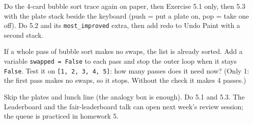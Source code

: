 \begin{differentiation}
\supportpath Do the 4-card bubble sort trace again on paper, then Exercise 5.1 only, then 5.3 with the plate stack beside the keyboard (push = put a plate on, pop = take one off).
\extensionpath Do 5.2 and its \texttt{most\_improved} extra, then add redo to Undo Paint with a second stack.
\end{differentiation}

\begin{stretchchallenge}
If a whole pass of bubble sort makes no swaps, the list is already sorted. Add a variable \texttt{swapped = False} to each pass and stop the outer loop when it stays \texttt{False}. Test it on \texttt{[1, 2, 3, 4, 5]}: how many passes does it need now? (Only 1: the first pass makes no swaps, so it stops. Without the check it makes 4 passes.)
\end{stretchchallenge}

\begin{teachernote}
Skip the plates and lunch line (the analogy box is enough). Do 5.1 and 5.3. The Leaderboard and the fair-leaderboard talk can open next week's review session; the queue is practiced in homework 5.
\end{teachernote}
